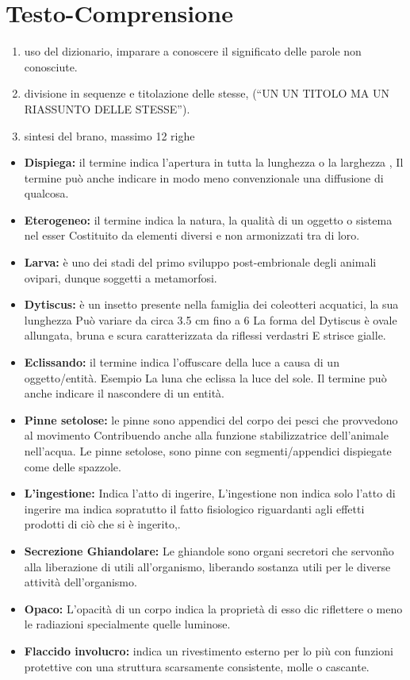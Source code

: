 \documentclass{article}
\begin{document}
\section{Testo-Comprensione}
\begin{enumerate}
  \item uso del dizionario, imparare a conoscere il significato delle parole non conosciute.
  \item divisione in sequenze e titolazione delle stesse, (“UN UN TITOLO MA UN RIASSUNTO DELLE STESSE”).
  \item sintesi del brano, massimo 12 righe
\end{enumerate}
\vspace{2cm}
\begin{itemize}

\item \textbf{Dispiega:} il termine indica l’apertura in tutta la lunghezza o la larghezza ,
Il termine può anche indicare in modo meno convenzionale una diffusione di qualcosa.
\item \textbf{Eterogeneo:} il termine indica la natura, la qualità di un oggetto o sistema nel esser 
Costituito da elementi diversi e non armonizzati tra di loro.
\item \textbf{Larva:} è uno dei stadi del primo sviluppo post-embrionale degli animali ovipari, dunque soggetti a metamorfosi.
\item \textbf{Dytiscus:} è un insetto presente nella famiglia dei coleotteri acquatici, la sua lunghezza
Può variare da circa 3.5 cm  fino a 6
La forma del Dytiscus è ovale allungata, bruna e scura caratterizzata da riflessi verdastri
E strisce gialle.
\item \textbf{Eclissando:}  il termine indica l’offuscare della luce a causa di un oggetto/entità. Esempio 
La luna che eclissa la luce del sole.
Il termine può anche indicare il nascondere di un entità.
\item \textbf{Pinne setolose:} le pinne sono appendici del corpo dei pesci che provvedono al movimento 
Contribuendo anche alla funzione stabilizzatrice dell’animale nell’acqua.
Le pinne setolose, sono pinne con segmenti/appendici dispiegate come delle spazzole.
\item \textbf{L’ingestione:} Indica l’atto di ingerire, L’ingestione non indica solo l’atto di ingerire ma indica sopratutto il fatto fisiologico riguardanti agli effetti prodotti di ciò che si è ingerito,.
\item \textbf{Secrezione Ghiandolare:} Le ghiandole sono organi secretori che servonño alla liberazione di utili all’organismo, liberando sostanza utili per le diverse attività dell’organismo.
\item \textbf{Opaco:} L'opacità di un corpo indica la proprietà di esso dic riflettere o meno le radiazioni specialmente quelle luminose. 
\item \textbf{Flaccido involucro:} indica un rivestimento esterno per lo più con funzioni protettive con una struttura scarsamente consistente, molle o cascante.


\end{itemize}
\end{document}
